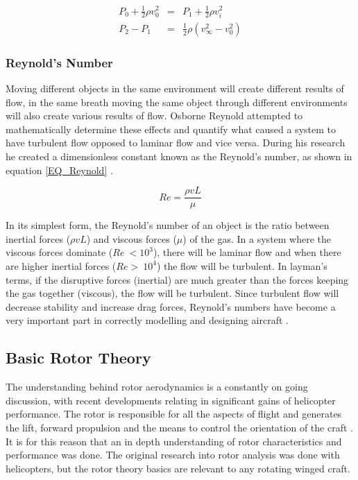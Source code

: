 		\begin{eqnarray}
		P_0 + \frac{1}{2} \rho v_0^2 &=& P_1 + \frac{1}{2} \rho v_i^2\label{EQ_Bernoulli}\\
		P_2 - P_1 &=& \frac{1}{2} \rho (v_\infty^2 - v_0^2)\label{EQ_Bernoulli2}
		\end{eqnarray}

		\subsubsection{Reynold's Number}
		Moving different objects in the same environment will create different results of flow, in the same breath moving the same object through different environments will also create various results of flow. Osborne Reynold attempted to mathematically determine these effects and quantify what caused a system to have turbulent flow opposed to laminar flow and vice versa. During his research he created a dimensionless constant known as the Reynold's number, as shown in equation \ref{EQ_Reynold} \cite{Reynold}. 
		
		\begin{equation}
		\label{EQ_Reynold}
		Re = \frac{\rho v L}{\mu}
		\end{equation} 
		
		In its simplest form, the Reynold's number of an object is the ratio between inertial forces ($\rho v L$) and viscous forces ($\mu$) of the gas. In a system where the viscous forces dominate ($Re ~< 10^3$), there will be laminar flow and when there are higher inertial forces ($Re >~ 10^4$) the flow will be turbulent. In layman's terms, if the disruptive forces (inertial) are much greater than the forces keeping the gas together (viscous), the flow will be turbulent. 
		Since turbulent flow will decrease stability and increase drag forces, Reynold's numbers have become a very important part in correctly modelling and designing aircraft \cite{Reynold}.


	\subsection{Basic Rotor Theory}
	The understanding behind rotor aerodynamics is a constantly on going discussion, with recent developments relating in significant gains of helicopter performance. The rotor is responsible for all the aspects of flight and generates the lift, forward propulsion and the means to control the orientation of the craft \cite{Leishman}. It is for this reason that an in depth understanding of rotor characteristics and performance was done. The original research into rotor analysis was done with helicopters, but the rotor theory basics are relevant to any rotating winged craft.
	
